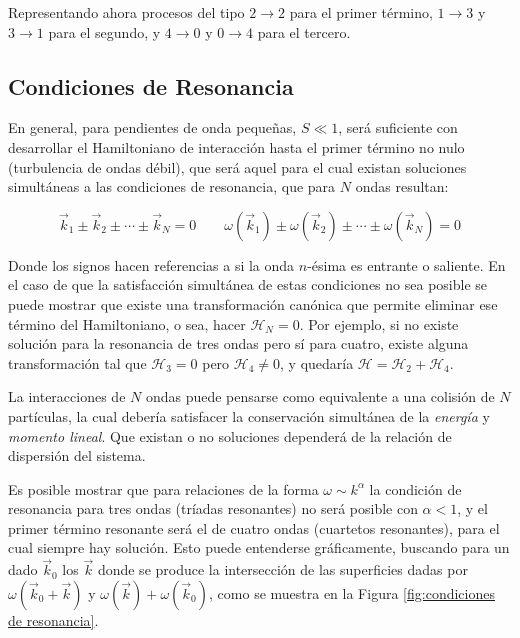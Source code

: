 Representando ahora procesos del tipo $2\rightarrow2$ para el primer término, $1\rightarrow3$ y $3\rightarrow1$ para el segundo, y $4\rightarrow0$ y $0\rightarrow4$ para el tercero.


\subsection{Condiciones de Resonancia} %
En general,  para pendientes de onda pequeñas, $S\ll1$, será suficiente con desarrollar el Hamiltoniano de interacción hasta el primer término no nulo (turbulencia de ondas débil), que será aquel para el cual existan soluciones simultáneas a las condiciones de resonancia, que para $N$ ondas resultan: 

\begin{equation} 
	\vec k_1 \pm \vec k_2 \pm \cdots \pm \vec k_N = 0 \qquad \omega(\vec k_1) \pm \omega(\vec k_2) \pm \cdots \pm \omega(\vec k_N) = 0
	\label{eq:condición_resonancia}
\end{equation}  

Donde los signos hacen referencias a si la onda $n$-ésima es entrante o saliente. En el caso de que la satisfacción simultánea de estas condiciones  no sea posible se puede mostrar que existe una transformación canónica que permite eliminar ese término del Hamiltoniano, o sea, hacer $\mathcal{H}_N=0$. Por ejemplo, si no existe solución para la resonancia de tres ondas pero sí para cuatro, existe alguna transformación tal que $\mathcal{H}_3=0$ pero $\mathcal{H}_4\neq0$, y quedaría $\mathcal{H}=\mathcal{H}_2+\mathcal{H}_4$. 

La interacciones de $N$ ondas puede pensarse como equivalente a una colisión de $N$ partículas, la cual debería satisfacer la conservación simultánea de la  \textit{energía} y \textit{momento lineal}. Que existan o no soluciones dependerá de la relación de dispersión del sistema. 

Es posible mostrar que para relaciones de la forma $\omega\sim k^{\alpha}$ la condición de resonancia para tres ondas (tríadas resonantes) no será posible con $\alpha<1$, y el primer término resonante será el de cuatro ondas (cuartetos resonantes), para el cual siempre hay solución. Esto puede entenderse gráficamente, buscando para un dado $\vec k_0$ los $\vec k$ donde se produce la intersección de las superficies dadas por $\omega(\vec k_0+\vec k)$ y $\omega(\vec k)+\omega(\vec k_0)$, como se muestra en la Figura \ref{fig:condiciones de resonancia}. %


